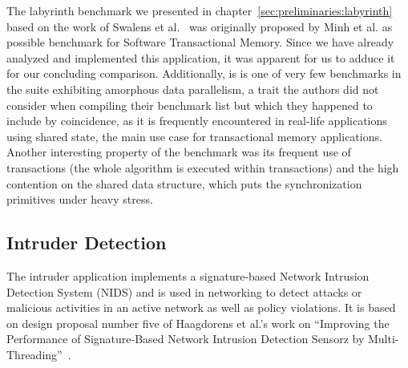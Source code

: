 The labyrinth benchmark we presented in chapter~\ref{sec:preliminaries:labyrinth} based on the work of Swalens et al.~\cite{swalens2016transactional} was originally proposed by Minh et al. as possible benchmark for Software Transactional Memory.
Since we have already analyzed and implemented this application, it was apparent for us to adduce it for our concluding comparison.
Additionally, is is one of very few benchmarks in the suite exhibiting amorphous data parallelism, a trait the authors did not consider when compiling their benchmark list but which they happened to include by coincidence, as it is frequently encountered in real-life applications using shared state, the main use case for transactional memory applications.
Another interesting property of the benchmark was its frequent use of transactions (the whole algorithm is executed within transactions) and the high contention on the shared data structure, which puts the synchronization primitives under heavy stress.




\subsection{Intruder Detection}
\label{sec:experiments:intruder}

The intruder application implements a signature-based Network Intrusion Detection System (NIDS) and is used in networking to detect attacks or malicious activities in an active network as well as policy violations.
It is based on design proposal number five of Haagdorens et al.'s work on \enquote{Improving the Performance of Signature-Based Network Intrusion Detection Sensorz by Multi-Threading}~\cite{haagdorens2004improving}.


